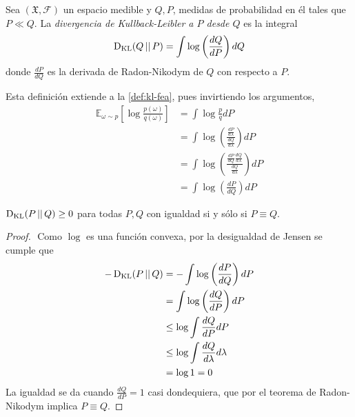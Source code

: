\documentclass[main.tex]{subfiles}
\begin{document}
\begin{definition}\label{def:kl}
	Sea $(\mathfrak{X}, \mathcal{F})$ un espacio medible y $Q, P$, medidas de
	probabilidad en él tales que $P \ll Q$. La \textit{divergencia de
	Kullback-Leibler a $P$ desde $Q$} es la integral
	\begin{equation}\label{eqn:kl}
		\operatorname*{D_{KL}}(Q\operatorname*{\mid\mid} P)=\int\log\left(\frac{dQ}{dP}\right)dQ
	\end{equation}
	donde $\frac{dP}{dQ}$ es la derivada de Radon-Nikodym de $Q$ con respecto a $P$.
\end{definition}

Esta definición extiende a la \ref{def:kl-fea}, pues invirtiendo los argumentos,
\begin{align*}
	\mathbb{E}_{\omega\sim p}\left[\log\frac{p(\omega)}{q(\omega)}\right] &= 
	\int\log\frac{p}{q}dP \\
	&= \int\log\left(\frac{\frac{dP}{d\lambda}}{\frac{dQ}{d\lambda}}\right)dP \\
	&= \int\log\left(\frac{\frac{dP}{dQ}\frac{dQ}{d\lambda}}{\frac{dQ}{d\lambda}}\right)dP \\
	&= \int\log\left(\frac{dP}{dQ}\right)dP
\end{align*}

\begin{prop}\label{prop:gibbs}
	$\operatorname*{D_{KL}}(P\operatorname*{\mid\mid} Q)\geq 0$ para todas $P, Q$ con igualdad si y sólo si $P\equiv Q$.
\end{prop}
\begin{proof}$ $ \newline
	Como $\log$ es una función convexa, por la desigualdad de Jensen se cumple que
	\begin{align*}
		-\operatorname*{D_{KL}}(P\operatorname*{\mid\mid} Q) &= -\int\log\left(\frac{dP}{dQ}\right)dP \\
			&= \int\log\left(\frac{dQ}{dP}\right)dP \\
			&\leq \log\int\frac{dQ}{dP}dP \\
			&\leq \log\int\frac{dQ}{d\lambda}d\lambda \\
			&=\log1=0
	\end{align*}
	La igualdad se da cuando $\frac{dQ}{dP}=1$ casi dondequiera, que por el teorema
	de Radon-Nikodym implica $P\equiv Q$. 
\end{proof}
\end{document}
